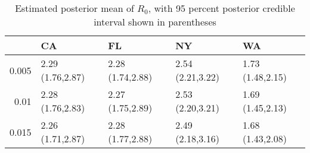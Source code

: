 \begin{table}[ht]
\centering
\begingroup\footnotesize
\begin{tabular}{rllll}
  \hline
 & CA & FL & NY & WA \\ 
  \hline
0.005 & 2.29 (1.76,2.87) & 2.28 (1.74,2.88) & 2.54 (2.21,3.22) & 1.73 (1.48,2.15) \\ 
  0.01 & 2.28 (1.76,2.83) & 2.27 (1.75,2.89) & 2.53 (2.20,3.21) & 1.69 (1.45,2.13) \\ 
  0.015 & 2.26 (1.71,2.87) & 2.28 (1.77,2.88) & 2.49 (2.18,3.16) & 1.68 (1.43,2.08) \\ 
   \hline
\end{tabular}
\endgroup
\caption{Estimated posterior mean of $R_{0}$, with 95 percent posterior credible interval shown in parentheses 
             \label{tab:R0}} 
\end{table}
